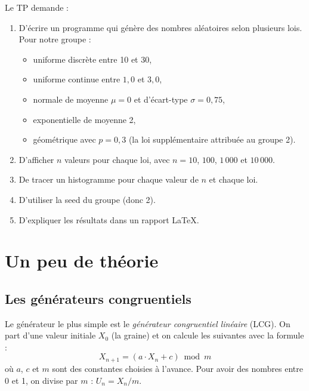 \documentclass[11pt,a4paper]{article}
\begin{document}
Le TP demande :
\begin{enumerate}
    \item D'\'ecrire un programme qui g\'en\`ere des nombres al\'eatoires selon
          plusieurs lois. Pour notre groupe :
          \begin{itemize}
              \item uniforme discr\`ete entre 10 et 30,
              \item uniforme continue entre $1{,}0$ et $3{,}0$,
              \item normale de moyenne $\mu = 0$ et d'\'ecart-type
                    $\sigma = 0{,}75$,
              \item exponentielle de moyenne 2,
              \item g\'eom\'etrique avec $p = 0{,}3$ (la loi suppl\'ementaire
                    attribu\'ee au groupe 2).
          \end{itemize}
    \item D'afficher $n$ valeurs pour chaque loi, avec $n = 10$, $100$, $1\,000$
          et $10\,000$.
    \item De tracer un histogramme pour chaque valeur de $n$ et chaque loi.
    \item D'utiliser la seed du groupe (donc 2).
    \item D'expliquer les r\'esultats dans un rapport LaTeX.
\end{enumerate}

\section{Un peu de th\'eorie}
\label{sec:theorie}

\subsection{Les g\'en\'erateurs congruentiels}

Le g\'en\'erateur le plus simple est le \emph{g\'en\'erateur congruentiel
lin\'eaire} (LCG). On part d'une valeur initiale $X_0$ (la graine) et on
calcule les suivantes avec la formule :
\begin{equation*}
    X_{n+1} = (a \cdot X_n + c) \bmod m
\end{equation*}
o\`u $a$, $c$ et $m$ sont des constantes choisies \`a l'avance. Pour avoir des
nombres entre 0 et 1, on divise par $m$ : $U_n = X_n / m$.
\end{document}
